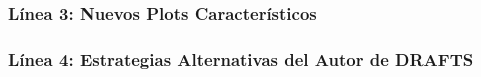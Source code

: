 \subsubsection{Línea 3: Nuevos Plots Característicos}

\subsubsection{Línea 4: Estrategias Alternativas del Autor de DRAFTS}
